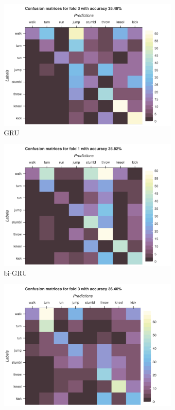 \begin{figure}[H]
\begin{subfigure}[b]{0.49\textwidth}
				\includegraphics[width=\textwidth]{img/GRU-Confusion_matrix_drop.png}
				\caption{GRU}
			\end{subfigure}
			\hfill
			\begin{subfigure}[b]{0.49\textwidth}
				\centering
				\includegraphics[width=\textwidth]{img/bi-GRU-Confusion_matrix_drop.png}
				\caption{bi-GRU}
			\end{subfigure}
			\hfill
			\begin{subfigure}[b]{0.49\textwidth}
				\centering
				\includegraphics[width=\textwidth]{img/LSTM-Confusion_matrix_drop.png}

\end{subfigure}
\end{figure}
